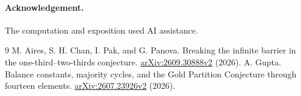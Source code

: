 \documentclass[10pt]{article}
\begin{document}
\paragraph{Acknowledgement.}
The computation and exposition used AI assistance.

\begin{thebibliography}{9}
 M. Aires, S. H. Chan, I. Pak, and G. Panova.
Breaking the infinite barrier in the one-third--two-thirds conjecture.
\href{https://arxiv.org/abs/2609.30888v2}{arXiv:2609.30888v2} (2026).
 A. Gupta. Balance constants, majority cycles, and the
Gold Partition Conjecture through fourteen elements.
\href{https://arxiv.org/abs/2607.23926v2}{arXiv:2607.23926v2} (2026).
\end{thebibliography}
\end{document}
